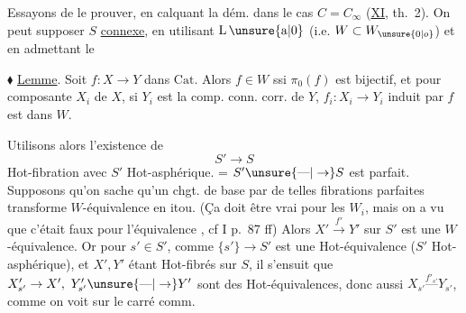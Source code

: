 
Essayons de le prouver, en calquant la dém. dans le cas $C=C_\infty$ (\uline{XI}, th.~2). On peut supposer $S$ \uline{connexe}, en  utilisant $\mathrm{L}\,\unsure{\mathrm{a}|0}$ (i.e. $W\subset W_{\unsure{0|o}}$) et en admettant le

$\blacklozenge$ \uline{Lemme}. Soit $f:X\to Y$ dans $\mathrm{Cat}$. Alors $f\in W$ ssi $\pi_0(f)$ est bijectif, et pour  composante  $X_i$ de $X$,  si $Y_i$ est la comp. conn. corr. de $Y$, $f_i:X_i\to Y_i$ induit par $f$ est dans $W$.

Utilisons alors l'existence de
\[ S'\longrightarrow S \]
Hot-fibration avec $S'$ Hot-asphérique.  = $S'\unsure{\text{---}|\to}S$ est parfait. Supposons qu'on sache qu'un chgt. de base par de telles fibrations parfaites transforme  $W$-équivalence en itou. (Ça doit être vrai pour les $W_i$, mais on a vu que c'était faux pour l'équivalence , cf I p.~87 ff) Alors
$X'\xrightarrow{f'}Y'$ sur $S'$ est une $W$-équivalence. Or pour $s'\in S'$, comme $\{s'\}\longrightarrow S'$ est une Hot-équivalence ($S'$ Hot-asphérique), et $X',Y'$ étant Hot-fibrés sur $S$, il s'ensuit que $X'_{s'}\to X',\ Y'_{s'}\unsure{\text{---}|\to}Y'$ sont des Hot-équivalences, donc aussi $X_{s'}\overset{f'_{s'}}{\text{---}}Y_{s'}$, comme on voit sur le carré comm.

